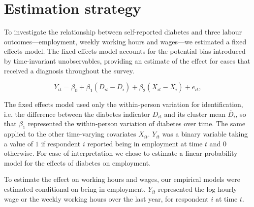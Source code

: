 \documentclass[12pt,english]{article}
\begin{document}

\section{\label{sec:Estimation Strategy}Estimation strategy}

To investigate the relationship between self-reported diabetes and three labour outcomes---employment, weekly working hours and wages---we estimated a fixed effects model. The fixed effects  model accounts for the potential bias introduced by time-invariant unobservables, providing an estimate of the effect for cases that received a diagnosis throughout the survey.


\begin{equation}
Y_{it}=\beta_{0}+\beta_{1}(D_{it}-\overline{D}_{i})+\beta_{2}(X_{it}-\overline{X}_i)+e_{it},\label{eq:cha4_employed}
\end{equation}

The fixed effects model used only the  within-person variation for identification, i.e. the difference between the diabetes indicator $D_{it}$ and its cluster mean $\overline{D}_{i}$, so that $\beta_{1}$ represented the within-person variation of diabetes over time. The same applied to the other time-varying covariates $X_{it}$. $Y_{it}$ was a binary variable taking a value of $1$ if respondent $i$ reported being in employment at time $t$ and $0$ otherwise. For ease of interpretation we chose to estimate a linear probability model for the effects of diabetes on employment.

To estimate the effect on working hours and wages, our empirical models were estimated conditional on being in employment. $Y_{it}$ represented the log hourly wage or the weekly working hours over the last year, for respondent $i$ at time $t$.
\end{document}
